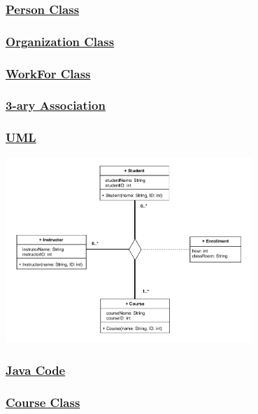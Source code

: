 \subsubsection*{\underline{Person Class}}



\subsubsection*{\underline{Organization Class}}


\newpage
\subsubsection*{\underline{WorkFor Class}}



\subsubsection*{\underline{3-ary Association}}
\subsubsection*{\underline{UML}}

\begin{center}
\includegraphics[width=0.7\textwidth]{Chapters/Diagram/OOP/EX2/ex2.e.drawio.pdf}
\end{center}


\subsubsection*{\underline{Java Code}}

\subsubsection*{\underline{Course Class}}

